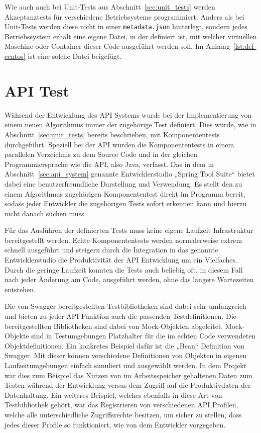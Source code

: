 Wie auch auch bei Unit\hyp{}Tests aus Abschnitt~\ref{sec:unit_tests} werden
Akzeptanztests für verschiedene Betriebsysteme programmiert. Anders als bei
Unit\hyp{}Tests werden diese nicht in einer \texttt{metadata.json} hinterlegt,
sondern jedes Betriebssystem erhält eine eigene Datei, in der definiert ist,
mit welcher virtuellen Maschine oder Container dieser Code ausgeführt werden
soll. Im Anhang~\ref{lst:def-centos} ist eine solche Datei beigefügt.
\mr%

\section{API Test}
\label{sec:api_test}
Während der Entwicklung des \gls{API} Systems wurde bei der Implementierung von
einem neuen Algorithmus immer der zugehörige Test definiert. Dies wurde, wie in
Abschnitt~\ref{sec:unit_tests} bereits beschrieben, mit Komponententests
durchgeführt. Speziell bei der \gls{API} wurden die Komponententests in einem
parallelen Verzeichnis zu dem Source Code und in der gleichen
Programmiersprache wie die \gls{API}, also Java, verfasst. Das in dem in
Abschnitt~\ref{sec:api_system} genannte Entwicklerstudio „Spring Tool Suite“
bietet dabei eine benutzerfreundliche Darstellung und Verwendung. Es stellt den
zu einem Algorithmus zugehörigen Komponententest direkt im Programm bereit,
sodass jeder Entwickler die zugehörigen Tests sofort erkennen kann und hierzu
nicht danach suchen muss.

Für das Ausführen der definierten Tests muss keine eigene Laufzeit
Infrastruktur bereitgestellt werden. Echte Komponententests werden
normalerweise extrem schnell ausgeführt und steigern durch die Integration in
das genannte Entwicklerstudio die Produktivität der \gls{API} Entwicklung um
ein Vielfaches. Durch die geringe Laufzeit konnten die Tests auch beliebig oft,
in diesem Fall nach jeder Änderung am Code, ausgeführt werden, ohne das längere
Wartezeiten entstehen.

Die von Swagger bereitgestellten Testbibliotheken sind dabei sehr umfangreich
und bieten zu jeder \gls{API} Funktion auch die passenden Testdefinitionen.
Die bereitgestellten Bibliotheken sind dabei von Mock-Objekten abgeleitet.
Mock-Objekte sind in Testumgebungen Platzhalter für die im echten Code
verwendeten Objektdefinitionen. Ein konkretes Beispiel dafür ist die „Bean“
Definition von Swagger. Mit dieser können verschiedene Definitionen von
Objekten in eigenen Laufzeitumgebungen einfach simuliert und ausgewählt werden.
In dem Projekt war dies zum Beispiel das Nutzen von im Arbeitsspeicher
gehaltenen Daten zum Testen während der Entwicklung versus dem Zugriff auf die
Produktivdaten der Datenhaltung. Ein weiteres Beispiel, welches ebenfalls in
diese Art von Testbibliothek gehört, war das Registrieren von verschiedenen
\gls{API} Profilen, welche alle unterschiedliche Zugriffsrechte besitzen, um
sicher zu stellen, dass jedes dieser Profile so funktioniert, wie von dem
Entwickler vorgegeben.

